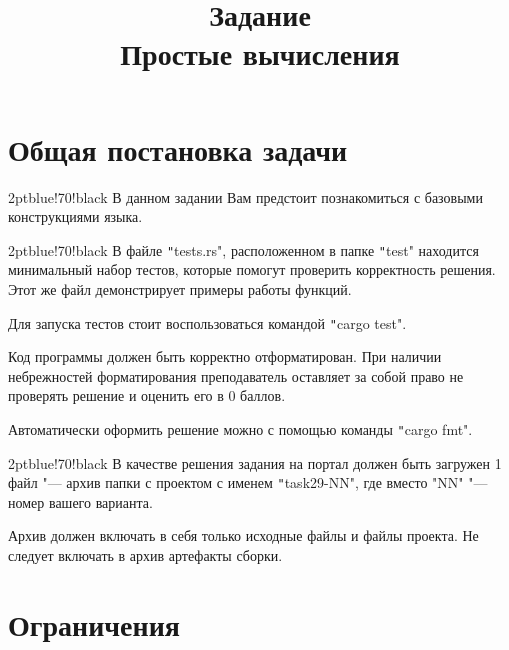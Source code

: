 \documentclass[a4paper, 10pt]{extarticle}
\begin{document}
\title{Задание \\ Простые вычисления }
\author{}
\date{}
\maketitle

\section{Общая постановка задачи}

\begin{awesomeblock}{2pt}{\faTasks}{blue!70!black}
    В данном задании Вам предстоит познакомиться с базовыми конструкциями языка.
\end{awesomeblock}

\begin{awesomeblock}{2pt}{\faTasks}{blue!70!black}
    В файле \texttt"tests.rs", расположенном в папке \texttt"test" находится минимальный набор тестов, которые помогут проверить корректность решения. Этот же файл демонстрирует примеры работы функций.

    Для запуска тестов стоит воспользоваться командой \texttt"cargo test".
\end{awesomeblock}

\begin{importantblock}
    Код программы должен быть корректно отформатирован. При наличии небрежностей форматирования преподаватель оставляет за собой право  не проверять решение и оценить его в 0 баллов. 

    Автоматически оформить решение можно с помощью команды \texttt"cargo fmt".
\end{importantblock}

\begin{awesomeblock}{2pt}{\faFile}{blue!70!black}
    В качестве решения задания на портал должен быть загружен 1 файл "--- архив папки с проектом с именем \texttt"task29-NN", где вместо \smlinline"NN" "--- номер вашего варианта.
    
    Архив должен включать в себя только исходные файлы и файлы проекта. Не следует включать в архив артефакты сборки. 
\end{awesomeblock}

\section{Ограничения}
\end{document}
